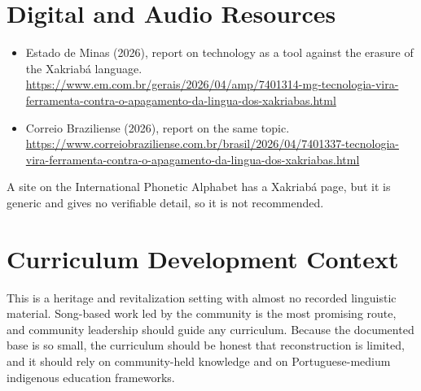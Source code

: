 \documentclass[12pt]{article}
\begin{document}
\section{Digital and Audio Resources}
\begin{itemize}
\item Estado de Minas (2026), report on technology as a tool against the erasure of the Xakriabá language. \url{https://www.em.com.br/gerais/2026/04/amp/7401314-mg-tecnologia-vira-ferramenta-contra-o-apagamento-da-lingua-dos-xakriabas.html}
\item Correio Braziliense (2026), report on the same topic. \url{https://www.correiobraziliense.com.br/brasil/2026/04/7401337-tecnologia-vira-ferramenta-contra-o-apagamento-da-lingua-dos-xakriabas.html}
\end{itemize}
A site on the International Phonetic Alphabet has a Xakriabá page, but it is generic and gives no verifiable detail, so it is not recommended.

\section{Curriculum Development Context}
This is a heritage and revitalization setting with almost no recorded linguistic material. Song-based work led by the community is the most promising route, and community leadership should guide any curriculum. Because the documented base is so small, the curriculum should be honest that reconstruction is limited, and it should rely on community-held knowledge and on Portuguese-medium indigenous education frameworks.
\end{document}
